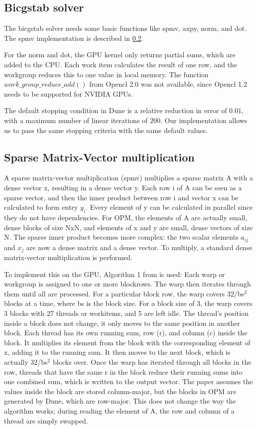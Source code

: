 \subsection{Bicgstab solver}
The bicgstab solver needs some basic functions like spmv, axpy, norm, and dot.
The spmv implementation is described in \ref{lab:spmv}.

For the norm and dot, the GPU kernel only returns partial sums, which are added to the CPU.
Each work item calculates the result of one row, and the workgroup reduces this to one value in local memory.
The function $work\_group\_reduce\_add()$ from Opencl 2.0 was not available, since Opencl 1.2 needs to be supported for NVIDIA GPUs.

The default stopping condition in Dune is a relative reduction in error of $0.01$, with a maximum number of linear iterations of $200$.
Our implementation allows us to pass the same stopping criteria with the same default values.

\subsection{Sparse Matrix-Vector multiplication}
\label{lab:spmv}
A sparse matrix-vector multiplication (spmv) multiplies a sparse matrix A with a dense vector x, resulting in a dense vector y.
Each row i of A can be seen as a sparse vector, and then the inner product between row i and vector x can be calculated to form entry $y_i$.
Every element of y can be calculated in parallel since they do not have dependencies.
For OPM, the elements of A are actually small, dense blocks of size NxN, and elements of x and y are small, dense vectors of size N.
The sparse inner product becomes more complex: the two scalar elements $a_{ij}$ and $x_j$ are now a dense matrix and a dense vector.
To multiply, a standard dense matrix-vector multiplication is performed.

To implement this on the GPU, Algorithm 1 from \cite{blocked_spmv} is used:
Each warp or workgroup is assigned to one or more blockrows.
The warp then iterates through them until all are processed.
For a particular block row, the warp covers 32/bs$^2$ blocks at a time, where bs is the block size.
For a block size of 3, the warp covers 3 blocks with 27 threads or workitems, and 5 are left idle.
The thread's position inside a block does not change, it only moves to the same position in another block.
Each thread has its own running sum, row (r), and column (c) inside the block.
It multiplies its element from the block with the corresponding element of x, adding it to the running sum.
It then moves to the next block, which is actually 32/bs$^2$ blocks over.
Once the warp has iterated through all blocks in the row, threads that have the same r in the block reduce their running sums into one combined sum, which is written to the output vector.
The paper assumes the values inside the block are stored column-major, but the blocks in OPM are generated by Dune\cite{dune}, which are row-major. This does not change the way the algorithm works; during reading the element of A, the row and column of a thread are simply swapped.

